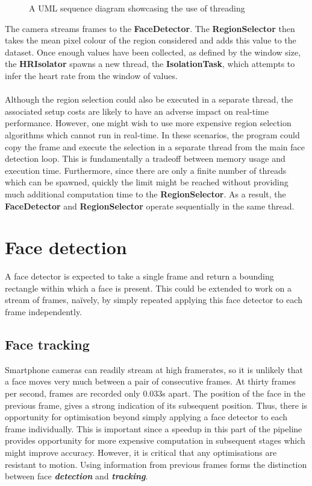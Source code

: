 \begin{figure}[H]
    \centering
    \scalebox{0.7}{}
   \caption{A UML sequence diagram showcasing the use of threading} 
\end{figure}
\noindent
The camera streams frames to the \textbf{FaceDetector}. The \textbf{RegionSelector} then takes the mean pixel colour of the region considered and adds this value to the dataset. Once enough values have been collected, as defined by the window size, the \textbf{HRIsolator} spawns a new thread, the \textbf{IsolationTask}, which attempts to infer the heart rate from the window of values. 
\\ \\
Although the region selection could also be executed in a separate thread, the associated setup costs are likely to have an adverse impact on real-time performance. However, one might wish to use more expensive region selection algorithms which cannot run in real-time. In these scenarios, the program could copy the frame and execute the selection in a separate thread from the main face detection loop. This is fundamentally a tradeoff between memory usage and execution time. Furthermore, since there are only a finite number of threads which can be spawned, quickly the limit might be reached without providing much additional computation time to the \textbf{RegionSelector}. As a result, the \textbf{FaceDetector} and \textbf{RegionSelector} operate sequentially in the same thread.
\section{Face detection}
A face detector is expected to take a single frame and return a bounding rectangle within which a face is present. This could be extended to work on a stream of frames, naïvely, by simply repeated applying this face detector to each frame independently.

\subsection{Face tracking}
\label{section:face_tracking_impl}
Smartphone cameras can readily stream at high framerates, so it is unlikely that a face moves very much between a pair of consecutive frames. At thirty frames per second, frames are recorded only 0.033s apart. The position of the face in the previous frame, gives a strong indication of its subsequent position. Thus, there is opportunity for optimisation beyond simply applying a face detector to each frame individually. This is important since a speedup in this part of the pipeline provides opportunity for more expensive computation in subsequent stages which might improve accuracy. However, it is critical that any optimisations are resistant to motion. Using information from previous frames forms the distinction between face \textbf{\textit{detection}} and \textbf{\textit{tracking}}.

